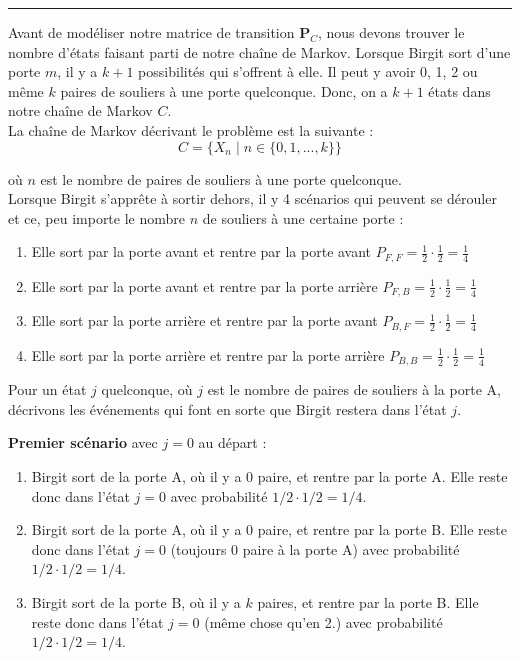 \documentclass{article}
\begin{document}
    \vspace{.5cm}
    \hrule
    \vspace{.5cm}

    Avant de modéliser notre matrice de transition $\boldsymbol{P}_C$, nous devons trouver le nombre d'états faisant parti de notre chaîne de Markov. Lorsque Birgit sort d'une porte $m$, il y a $k + 1$ possibilités qui s'offrent à elle. Il peut y avoir 0, 1, 2 ou même $k$ paires de souliers à une porte quelconque. Donc, on a \(k + 1\) états dans notre chaîne de Markov $C$. \\
    
    La chaîne de Markov décrivant le problème est la suivante :
    \[
       C = \{X_n \mid n \in \{0, 1, ..., k\}\}
    \]
    
    \hspace{.5cm} où $n$ est le nombre de paires de souliers à une porte quelconque. \\

    Lorsque Birgit s'apprête à sortir dehors, il y 4 scénarios qui peuvent se dérouler et ce, peu importe le nombre $n$ de souliers à une certaine porte :
    \begin{enumerate}
        \item Elle sort par la porte avant et rentre par la porte avant $P_{F,F} = \frac{1}{2} \cdot \frac{1}{2} = \frac{1}{4}$
        \item Elle sort par la porte avant et rentre par la porte arrière $P_{F,B} = \frac{1}{2} \cdot \frac{1}{2} = \frac{1}{4}$
        \item Elle sort par la porte arrière et rentre par la porte avant $P_{B,F} = \frac{1}{2} \cdot \frac{1}{2} = \frac{1}{4}$
        \item Elle sort par la porte arrière et rentre par la porte arrière $P_{B,B} = \frac{1}{2} \cdot \frac{1}{2} = \frac{1}{4}$
    \end{enumerate}
    
    Pour un état $j$ quelconque, où $j$ est le nombre de paires de souliers à la porte A, décrivons les événements qui font en sorte que Birgit restera dans l'état $j$.
    
    \vspace{.2cm}
    \textbf{Premier scénario} avec $j = 0$ au départ :
    \begin{enumerate}[left=1cm]
        \item Birgit sort de la porte A, où il y a 0 paire, et rentre par la porte A. Elle reste donc dans l'état $j = 0$ avec probabilité $1/2 \cdot 1/2 = 1/4$.
        \item Birgit sort de la porte A, où il y a 0 paire, et rentre par la porte B. Elle reste donc dans l'état $j = 0$ (toujours 0 paire à la porte A) avec probabilité $1/2 \cdot 1/2 = 1/4$.
        \item Birgit sort de la porte B, où il y a $k$ paires, et rentre par la porte B. Elle reste donc dans l'état $j = 0$ (même chose qu'en 2.) avec probabilité $1/2 \cdot 1/2 = 1/4$.
    \end{enumerate}
\end{document}
